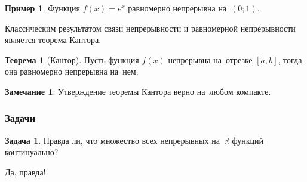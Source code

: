 \documentclass[pdftex, 12pt, a4paper]{article}
\def\R{\ensuremath{\mathbb{R}}} %
\theoremstyle{definition} %
\newtheorem*{rem}{Замечание}
\newtheorem{myex}{Пример}
\newtheorem{myth}{Теорема}
\newtheorem{problem}{Задача}
\numberwithin{problem}{section}
\numberwithin{blits}{section}
\begin{document}
\begin{myex}
Функция $f(x)=e^{x}$ равномерно непрерывна на~$(0;1)$.
\end{myex}

Классическим результатом связи непрерывности и равномерной непрерывности является теорема Кантора.

\begin{myth}[Кантор]
Пусть функция $f(x)$ непрерывна на~отрезке $[a,b]$, тогда она равномерно непрерывна на~нем.
\end{myth}

\begin{rem}
Утверждение теоремы Кантора верно на~любом компакте.
\end{rem}

\subsubsection*{Задачи}

\begin{problem}
Правда ли, что множество всех непрерывных на~$\R$ функций континуально?
\begin{sol}
Да, правда!
\end{sol}
\end{problem}
\end{document}
